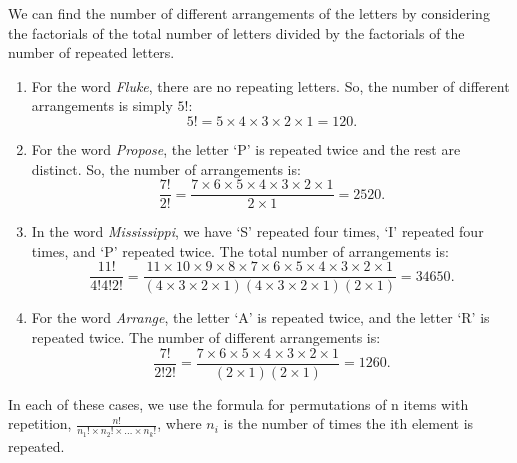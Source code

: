         \begin{solution}
            We can find the number of different arrangements of the letters by considering the factorials of the total number of letters divided by the factorials of the number of repeated letters.
            
            \begin{enumerate}[label=(\alph*)]
            \item For the word \emph{Fluke}, there are no repeating letters. So, the number of different arrangements is simply \(5!\):
            \[ 5! = 5 \times 4 \times 3 \times 2 \times 1 = 120. \]
            
            \item For the word \emph{Propose}, the letter `P' is repeated twice and the rest are distinct. So, the number of arrangements is:
            \[ \frac{7!}{2!} = \frac{7 \times 6 \times 5 \times 4 \times 3 \times 2 \times 1}{2 \times 1} = 2520. \]
            
            \item In the word \emph{Mississippi}, we have `S' repeated four times, `I' repeated four times, and `P' repeated twice. The total number of arrangements is:
            \[ \frac{11!}{4!4!2!} = \frac{11 \times 10 \times 9 \times 8 \times 7 \times 6 \times 5 \times 4 \times 3 \times 2 \times 1}{(4 \times 3 \times 2 \times 1)(4 \times 3 \times 2 \times 1)(2 \times 1)} = 34650. \]
            
            \item For the word \emph{Arrange}, the letter `A' is repeated twice, and the letter `R' is repeated twice. The number of different arrangements is:
            \[ \frac{7!}{2!2!} = \frac{7 \times 6 \times 5 \times 4 \times 3 \times 2 \times 1}{(2 \times 1)(2 \times 1)} = 1260. \]
            \end{enumerate}
            In each of these cases, we use the formula for permutations of n items with repetition, \(\frac{n!}{n_1! \times n_2! \times \ldots \times n_k!}\), where \(n_i\) is the number of times the ith element is repeated.
        \end{solution}

